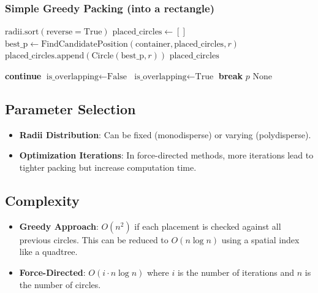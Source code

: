 \subsubsection*{Simple Greedy Packing (into a rectangle)}
\begin{algorithm}[ht]
\label{alg:greedy_circle_packing}
\begin{algorithmic}[1]
    \State $\text{radii}.\text{sort}(\text{reverse}=\text{True})$
    \State $\text{placed\_circles} \gets []$
        \State $\text{best\_p} \gets \text{FindCandidatePosition}(\text{container}, \text{placed\_circles}, r)$
            \State $\text{placed\_circles}.\text{append}(\text{Circle}(\text{best\_p}, r))$
        \EndIf
    \EndFor
    \State \Return $\text{placed\_circles}$
\EndFunction

            \State \textbf{continue}
        \EndIf
        \State $\text{is\_overlapping} \gets \text{False}$
                \State $\text{is\_overlapping} \gets \text{True}$
                \State \textbf{break}
            \EndIf
        \EndFor
            \State \Return $p$
        \EndIf
    \EndFor
    \State \Return $\text{None}$
\EndFunction
\end{algorithmic}
\end{algorithm}

\subsection{Parameter Selection}
\begin{itemize}
    \item \textbf{Radii Distribution}: Can be fixed (monodisperse) or varying (polydisperse).
    \item \textbf{Optimization Iterations}: In force-directed methods, more iterations lead to tighter packing but increase computation time.
\end{itemize}

\subsection{Complexity}
\begin{itemize}
    \item \textbf{Greedy Approach}: $O(n^2)$ if each placement is checked against all previous circles. This can be reduced to $O(n \log n)$ using a spatial index like a quadtree.
    \item \textbf{Force-Directed}: $O(i \cdot n \log n)$ where $i$ is the number of iterations and $n$ is the number of circles.
\end{itemize}


